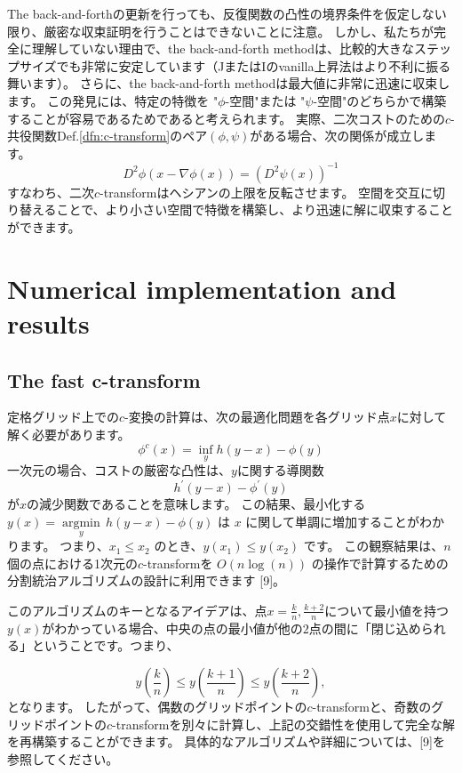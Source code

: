\documentclass{jsarticle}
\theoremstyle{definition}
\begin{document}
\vspace\baselineskip 

The back-and-forthの更新を行っても、反復関数の凸性の境界条件を仮定しない限り、厳密な収束証明を行うことはできないことに注意。
しかし、私たちが完全に理解していない理由で、the back-and-forth methodは、比較的大きなステップサイズでも非常に安定しています（JまたはIのvanilla上昇法はより不利に振る舞います）。
さらに、the back-and-forth methodは最大値に非常に迅速に収束します。
この発見には、特定の特徴を "$\phi$-空間"または "$\psi$-空間"のどちらかで構築することが容易であるためであると考えられます。
実際、二次コストのための$c$-共役関数Def.\ref{dfn:c-transform}のペア$(\phi, \psi)$がある場合、次の関係が成立します。
$$
D^2 \phi(x - \nabla\phi(x)) = (D^2 \psi(x))^{-1}
$$
すなわち、二次$c$-transformはヘシアンの上限を反転させます。
空間を交互に切り替えることで、より小さい空間で特徴を構築し、より迅速に解に収束することができます。


\section{Numerical implementation and results}
\subsection{The fast c-transform}


定格グリッド上での$c$-変換の計算は、次の最適化問題を各グリッド点$x$に対して解く必要があります。
$$
\phi^c(x) = \inf_y h(y - x) - \phi(y)
$$
一次元の場合、コストの厳密な凸性は、$y$に関する導関数
$$
h^\prime(y - x) - \phi^\prime(y)
$$
が$x$の減少関数であることを意味します。
この結果、最小化する $y(x)=\underset{y}{\operatorname{argmin}} \, h(y-x) - \phi(y)$ は $x$ に関して単調に増加することがわかります。
つまり、$x_1 \leq x_2$ のとき、$y(x_1) \leq y(x_2)$ です。
この観察結果は、$n$個の点における1次元の$c$-transformを $O(n \log(n))$ の操作で計算するための分割統治アルゴリズムの設計に利用できます [9]。


このアルゴリズムのキーとなるアイデアは、点$x = \frac{k}{n},\frac{k + 2}{n}$について最小値を持つ$y(x)$がわかっている場合、中央の点の最小値が他の$2$点の間に「閉じ込められる」ということです。つまり、

$$
y\left(\frac{k}{n} \right) \leq y\left(\frac{k + 1}{n} \right) \leq y\left(\frac{k + 2}{n} \right),
$$
となります。
したがって、偶数のグリッドポイントの$c$-transformと、奇数のグリッドポイントの$c$-transformを別々に計算し、上記の交錯性を使用して完全な解を再構築することができます。
具体的なアルゴリズムや詳細については、[9]を参照してください。\\
\end{document}
